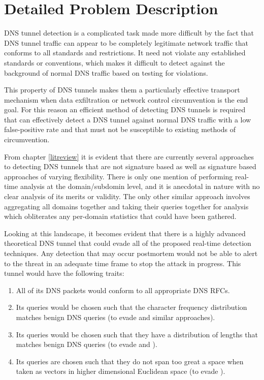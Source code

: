 \documentclass[12pt]{report}
\theoremstyle{remark}
\theoremstyle{definition}
\theoremstyle{definition}
\theoremstyle{definition}
\begin{document}
\section{Detailed Problem Description}

DNS tunnel detection is a complicated
task made more difficult by the fact that DNS tunnel traffic can appear to be completely
legitimate network traffic that conforms to all standards and restrictions. It
need not violate any established standards or conventions, which makes it
difficult to detect against the background of normal DNS traffic based on
testing for violations.

This property of DNS tunnels makes them a particularly effective transport
mechanism when data exfiltration or network control circumvention is the end
goal. For this reason an efficient method of detecting DNS tunnels is required
that can effectively detect a DNS tunnel against normal DNS traffic with a low
false-positive rate and that must not be susceptible to existing methods of
circumvention.

From chapter \ref{litreview} it is evident that there are currently several
approaches to detecting DNS tunnels that are not signature based as well as
signature based approaches of varying flexibility. There is only one mention of
performing real-time analysis at the domain/subdomin level, and it is anecdotal
in nature with no clear analysis of its merits or validity. The only other
similar approach involves aggregating all domains together and taking their
queries together for analysis which obliterates any per-domain statistics that
could have been gathered.

Looking at this landscape, it becomes evident that there is a highly advanced
theoretical DNS tunnel that could evade all of the proposed real-time detection
techniques. Any detection that may occur postmortem would not be able to alert
to the threat in an adequate time frame to stop the attack in progress. This
tunnel would have the following traits:

\label{supertunnel}
\begin{enumerate}
\item All of its DNS packets would conform
to all appropriate DNS RFCs.
\item Its queries would be chosen such that the
character frequency distribution matches benign DNS queries (to evade
\cite{Born2010.cfa} and similar approaches).
\item Its queries would be chosen
such that they have a distribution of lengths that matches benign DNS queries
(to evade \cite{Karasaridis2006} and \cite{SANS2013}).
\item Its queries are
chosen such that they do not span too great a space when taken as vectors in
higher dimensional Euclidean space (to evade \cite{jhind2009}). \end{enumerate}
\end{document}
